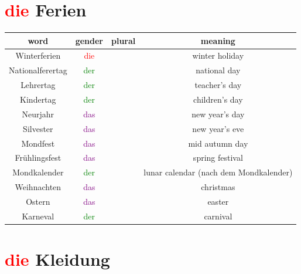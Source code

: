 \section{\textcolor{red}{die} Ferien}
\begin{center}
    \begin{tabular}{|c|c|c|c|}
        \hline
        \rowcolor{gray}
        word             & gender                  & plural & meaning                                \\
        \hline
        Winterferien     & \textcolor{red}{die}    &        & winter holiday                         \\
        \hline
        Nationalferertag & \textcolor{green}{der}  &        & national day                           \\
        Lehrertag        & \textcolor{green}{der}  &        & teacher's day                          \\
        Kindertag        & \textcolor{green}{der}  &        & children's day                         \\
        Neurjahr         & \textcolor{purple}{das} &        & new year's day                         \\
        Silvester        & \textcolor{purple}{das} &        & new year's eve                         \\
        \hline
        Mondfest         & \textcolor{purple}{das} &        & mid autumn day                         \\
        Frühlingsfest    & \textcolor{purple}{das} &        & spring festival                        \\
        Mondkalender     & \textcolor{green}{der}  &        & lunar calendar (nach dem Mondkalender) \\
        \hline
        Weihnachten      & \textcolor{purple}{das} &        & christmas                              \\
        Ostern           & \textcolor{purple}{das} &        & easter                                 \\
        Karneval         & \textcolor{green}{der}  &        & carnival                               \\
        \hline
    \end{tabular}
\end{center}

\section{\textcolor{red}{die} Kleidung}

